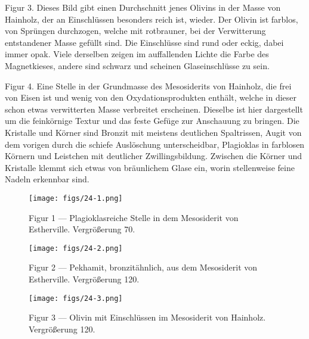 \documentclass[a4paper, 11pt, oneside, polutonikogreek, german]{article}
\begin{document}
Figur 3. Dieses Bild gibt einen Durchschnitt jenes Olivins in der Masse von Hainholz, der an Einschlüssen besonders reich ist, wieder. Der Olivin ist farblos, von Sprüngen durchzogen, welche mit rotbrauner, bei der Verwitterung entstandener Masse gefüllt sind. Die Einschlüsse sind rund oder eckig, dabei immer opak. Viele derselben zeigen im auffallenden Lichte die Farbe des Magnetkieses, andere sind schwarz und scheinen Glaseinschlüsse zu sein.

Figur 4. Eine Stelle in der Grundmasse des Mesosiderits von Hainholz, die frei von Eisen ist und wenig von den Oxydationsprodukten enthält, welche in dieser schon etwas verwitterten Masse verbreitet erscheinen. Dieselbe ist hier dargestellt um die feinkörnige Textur und das feste Gefüge zur Anschauung zu bringen. Die Kristalle und Körner sind Bronzit mit meistens deutlichen Spaltrissen, Augit von dem vorigen durch die schiefe Auslöschung unterscheidbar, Plagioklas in farblosen Körnern und Leistchen mit deutlicher Zwillingsbildung. Zwischen die Körner und Kristalle klemmt sich etwas von bräunlichem Glase ein, worin stellenweise feine Nadeln erkennbar sind.
\clearpage

\vspace*{\fill}
\begin{figure}[H]
\centering
\texttt{[image: figs/24-1.png]}
\caption{\small Figur 1 --- Plagioklasreiche Stelle in dem Mesosiderit von Estherville. Vergrößerung 70.}
\end{figure}
\vspace*{\fill}
\clearpage

\vspace*{\fill}
\begin{figure}[H]
\centering
\texttt{[image: figs/24-2.png]}
\caption{\small Figur 2 --- Pekhamit, bronzitähnlich, aus dem Mesosiderit von Estherville. Vergrößerung 120.}
\end{figure}
\vspace*{\fill}
\clearpage

\vspace*{\fill}
\begin{figure}[H]
\centering
\texttt{[image: figs/24-3.png]}
\caption{\small Figur 3 --- Olivin mit Einschlüssen im Mesosiderit von Hainholz. Vergrößerung 120.}
\end{figure}
\vspace*{\fill}
\clearpage
\end{document}
